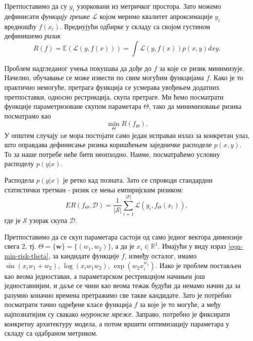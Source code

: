 \documentclass[12pt, a4paper, twoside]{book}
\numberwithin{equation}{chapter}
\numberwithin{theorem}{section}
\numberwithin{definition}{section}
\numberwithin{definitionChapter}{chapter}
\begin{document}
Претпоставимо да су $y_i$ узорковани из метричког простора. Зато можемо дефинисати
\textit{функцију грешке} $\mathcal{L}$ којом меримо квалитет апроксимације $y_i$
вредношћу $f(x_i)$. Вреднујући одбирке у складу са својом густином дефинишемо \textit{ризик}
\begin{equation}
	R(f) = \mathbb{E}(\mathcal{L}(y, f(x)))=\int\mathcal{L}(y, f(x))p(x, y)dxy.
	\label{eqn-risk}
\end{equation}

Проблем надгледаног учења покушава да дође до $f$ за које се ризик минимизује. Начелно,
обучавање се може извести по свим могућим функцијама $f$. Како је то практично немогуће,
претрага функција се усмерава увођењем додатних претпоставки, односно рестрикција, скупа
претраге. Ми ћемо посматрати функције параметризоване скупом параметара $\Theta$,
тако да минимизовање ризика посматрамо као
\begin{equation}
	\min_{\Theta}R(f_{\Theta}).
	\label{eqn-min-risk-theta}
\end{equation}
У општем случају nе мора постојати само један исправан излаз за конкретан улаз, што оправдава
дефинисање ризика коришћењем заједничке расподеле $p(x, y)$. То за наше потребе неће бити
неопходно. Наиме, посматраћемо условну расподелу $p(y\vert x)$.

Расподела $p(y\vert x)$ је ретко кад позната. Зато се спроводи стандардни статистички
третман - ризик се мења емпиријским ризиком:
\begin{equation}
	ER(f_\Theta, \mathcal{D}) = \frac{1}{\vert \mathcal{S}\vert}\sum_{i=1}^{\vert \mathcal{S}\vert}\mathcal{L}(y_i, f_\Theta(x_i)),
\end{equation}
где је $\mathcal{S}$ узорак скупа $\mathcal{D}$.

Претпоставимо да се скуп параметара састоји од само једног вектора димензије свега $2$,
тј. $\Theta = \{\mathbf{w}\} = \{(w_1, w_2)\}$,
а да је $x_i \in \mathbb{R}^{1}$. Имајући у виду израз \ref{eqn-min-risk-theta}, за кандидате
функције $f$, између осталог, имамо $\sin(x_i w_1 + w_2)$, $\log(x_i w_1 w_2)$,
$\exp(w_2x_i^{w_1})$. Иако је проблем постављен као веома једноставан, а параметарском
рестрикцијом начињен још једноставнијим, и даље се чини као веома тежак будући да немамо
начин да за разумно коначно времена претражимо све такве кандидате. Зато је потребно посматрати
тачно одређене класе функција $f$ за које је то могуће, а међу најпознатијим су свакако
\textit{неуронске мреже}. Заправо, потребно је фиксирати конкретну архитектуру модела, а
потом вршити оптимизацију параметара у складу са одабраном метриком.
\end{document}
